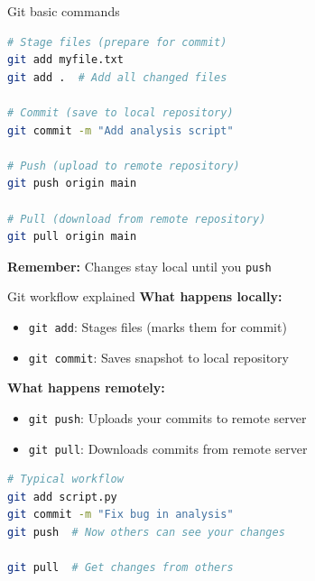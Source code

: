 \documentclass[aspectratio=169]{beamer}
\begin{document}
\begin{frame}[fragile]{Git basic commands}
    \begin{lstlisting}[language=bash]
# Stage files (prepare for commit)
git add myfile.txt
git add .  # Add all changed files

# Commit (save to local repository)
git commit -m "Add analysis script"

# Push (upload to remote repository)
git push origin main

# Pull (download from remote repository)
git pull origin main
\end{lstlisting}
    
    \vspace{0.3cm}
    \textbf{Remember:} Changes stay local until you \texttt{push}
\end{frame}

\begin{frame}[fragile]{Git workflow explained}
    \textbf{What happens locally:}
    \begin{itemize}
        \item \texttt{git add}: Stages files (marks them for commit)
        \item \texttt{git commit}: Saves snapshot to local repository
    \end{itemize}
    
    \vspace{0.3cm}
    \textbf{What happens remotely:}
    \begin{itemize}
        \item \texttt{git push}: Uploads your commits to remote server
        \item \texttt{git pull}: Downloads commits from remote server
    \end{itemize}
    
    \vspace{0.3cm}
    \begin{lstlisting}[language=bash]
# Typical workflow
git add script.py
git commit -m "Fix bug in analysis"
git push  # Now others can see your changes

git pull  # Get changes from others
\end{lstlisting}
\end{frame}

\end{document}
